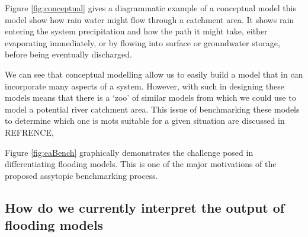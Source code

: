 \documentclass[11pt]{article}
\begin{document}
\begin{minipage}{0.4\textwidth}
    \qquad Figure \ref{fig:conceptual} gives a diagrammatic example of a conceptual model this model show how rain water might flow through a catchment area. It shows rain entering the system precipitation and how the path it might take, either evaporating immediately, or by flowing into surface or groundwater storage, before being eventually discharged.

    \qquad We can see that conceptual modelling allow us to easily build a model that in can incorporate many aspects of a system. However, with such in designing these models means that there is a `zoo' of similar models from which we could use to model a potential river catchment area. This issue of benchmarking these models to determine which one is mots suitable for a given situation are discussed in REFRENCE, 

    \qquad Figure \ref{fig:eaBench}  graphically demonstrates the challenge posed in differentiating flooding models. This is one of the major motivations of the proposed assytopic benchmarking process.
\end{minipage}







\subsection{How do we currently interpret the output of flooding models}
\end{document}
